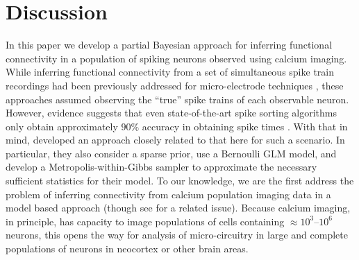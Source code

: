 \documentclass[aoas,preprint]{imsart}
\begin{document}
\section{Discussion}
\label{sec:discussion}
In this paper we develop a partial Bayesian approach for inferring functional connectivity in a population of spiking neurons observed using calcium imaging. While inferring functional connectivity from a set of simultaneous spike train recordings had been previously addressed for micro-electrode techniques \cite{PAN03c, TRUC05}, these approaches assumed observing the ``true'' spike trains of each observable neuron.  However, evidence suggests that even state-of-the-art spike sorting algorithms only obtain approximately $90\%$ accuracy in obtaining spike times \cite{HarrisBuzsaki00, WoodBlack08}.  With that in mind, \cite{Rigat06} developed an approach closely related to that here for such a scenario.  In particular, they also consider a sparse prior, use a Bernoulli GLM model, and develop a Metropolis-within-Gibbs sampler to approximate the necessary sufficient statistics for their model.  To our knowledge, we are the first address the problem of inferring connectivity from calcium population imaging data in a model based approach (though see \cite{Roxin08} for a related issue).  Because calcium imaging, in principle, has capacity to image populations of cells containing $\approx 10^3$--$10^6$ neurons, this opens the way for analysis of micro-circuitry in large and complete populations of neurons in neocortex or other brain areas.

\end{document}
